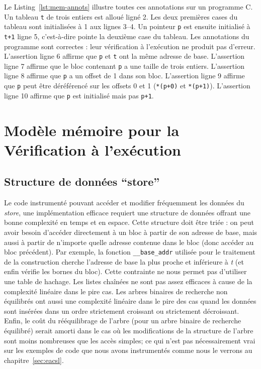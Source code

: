 


Le Listing~\ref{lst:mem-annots} illustre toutes ces annotations sur un programme
C.
Un tableau \lstinline't' de trois entiers est alloué ligné 2.
Les deux premières cases du tableau sont initialisées à 1 aux lignes 3--4.
Un pointeur \lstinline'p' est ensuite initialisé à \lstinline't+1' ligne 5,
c'est-à-dire pointe la deuxième case du tableau.
Les annotations du programme sont correctes : leur vérification à l'exécution
ne produit pas d'erreur.
L'assertion ligne 6 affirme que \lstinline'p' et \lstinline't' ont la même
adresse de base.
L'assertion ligne 7 affirme que le bloc contenant \lstinline'p' a une taille de
trois entiers.
L'assertion ligne 8 affirme que \lstinline'p' a un offset de 1 dans son bloc.
L'assertion ligne 9 affirme que \lstinline'p' peut être déréférencé sur les
offsets 0 et 1 (\lstinline'*(p+0)' et \lstinline'*(p+1)').
L'assertion ligne 10 affirme que \lstinline'p' est initialisé mais pas
\lstinline'p+1'.


\section{Modèle mémoire pour la Vérification à l'exécution}
\label{sec:mem-model}


\subsection{Structure de données ``store''}

Le code instrumenté pouvant accéder et modifier fréquemment les données du
\textit{store}, une implémentation efficace requiert une structure de données
offrant une bonne complexité en temps et en espace.
Cette structure doit être triée : on peut avoir besoin d'accéder directement à
un bloc à partir de son adresse de base, mais aussi à partir de n'importe quelle
adresse contenue dans le bloc (donc accéder au bloc précédent).
Par exemple, la fonction \lstinline'__base_addr' utilisée pour le traitement
de la construction \baseaddrt cherche l'adresse de base la
plus proche et inférieure à \textit{t} (et enfin vérifie les bornes du bloc).
Cette contrainte ne nous permet pas d'utiliser une table de hachage.
Les listes chaînées ne sont pas assez efficaces à cause de la complexité
linéaire dans le pire cas.
Les arbres binaires de recherche non équilibrés ont aussi une complexité
linéaire dans le pire des cas quand les données sont insérées dans un ordre
strictement croissant ou strictement décroissant.
Enfin, le coût du rééquilibrage de l'arbre (pour un arbre binaire de recherche
équilibré) serait amorti dans le cas où les modifications de la structure de
l'arbre sont moins nombreuses que les accès simples; ce qui n'est pas
nécessairement vrai sur les exemples de code que nous avons instrumentés comme
nous le verrons au chapitre~\ref{sec:eacsl}.

